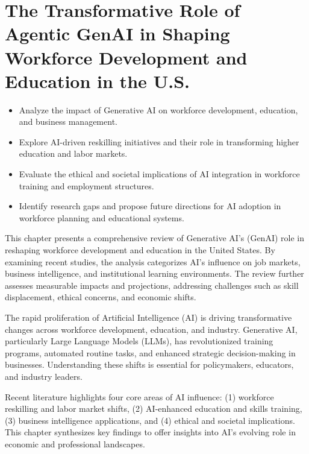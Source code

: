 \documentclass[a4paper,headinclude=on,footinclude=on,12pt,oneside]{scrbook}
\begin{document}
\chapter{The Transformative Role of Agentic GenAI in Shaping Workforce Development and Education in the U.S.}

\begin{itemize}
	\item Analyze the impact of Generative AI on workforce development, education, and business management.
	\item Explore AI-driven reskilling initiatives and their role in transforming higher education and labor markets.
	\item Evaluate the ethical and societal implications of AI integration in workforce training and employment structures.
	\item Identify research gaps and propose future directions for AI adoption in workforce planning and educational systems.
\end{itemize}

This chapter presents a comprehensive review of Generative AI's (GenAI) role in reshaping workforce development and education in the United States. By examining recent studies, the analysis categorizes AI's influence on job markets, business intelligence, and institutional learning environments. The review further assesses measurable impacts and projections, addressing challenges such as skill displacement, ethical concerns, and economic shifts.


The rapid proliferation of Artificial Intelligence (AI) is driving transformative changes across workforce development, education, and industry. Generative AI, particularly Large Language Models (LLMs), has revolutionized training programs, automated routine tasks, and enhanced strategic decision-making in businesses. Understanding these shifts is essential for policymakers, educators, and industry leaders.

Recent literature highlights four core areas of AI influence: (1) workforce reskilling and labor market shifts, (2) AI-enhanced education and skills training, (3) business intelligence applications, and (4) ethical and societal implications. This chapter synthesizes key findings to offer insights into AI’s evolving role in economic and professional landscapes.

\end{document}
